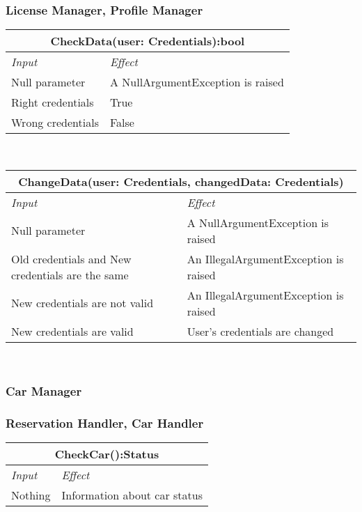 			\subsubsection*{License Manager, Profile Manager}
			\begin{tabular}{ |l|l| }
				\hline
				\multicolumn{2}{|c|}{CheckData(user: Credentials):bool}\\
				\hline 
				\textit{Input}&\textit{Effect}\\ \hline
				Null parameter & A NullArgumentException is raised\\ \hline
				Right credentials & True\\ \hline
				Wrong credentials & False\\ \hline
			\end{tabular}
			\\
			\begin{tabular}{ |l|l| }
				\hline
				\multicolumn{2}{|c|}{ChangeData(user: Credentials, changedData: Credentials)}\\
				\hline
				\textit{Input}&\textit{Effect}\\ \hline
				Null parameter & A NullArgumentException is raised\\ \hline
				Old credentials and New credentials are the same & An IllegalArgumentException is raised \\ \hline
				New credentials are not valid & An IllegalArgumentException is raised\\ \hline
				New credentials are valid & User's credentials are changed \\ \hline
			\end{tabular}
			\\	
		
		\subsubsection{Car Manager}		
			\subsubsection*{Reservation Handler, Car Handler}
			\begin{tabular}{ |l|l| }
				\hline
				\multicolumn{2}{|c|}{CheckCar():Status}\\
				\hline
				\textit{Input}&\textit{Effect}\\ \hline
				Nothing & Information about car status \\ \hline
			\end{tabular}
			\\
			
